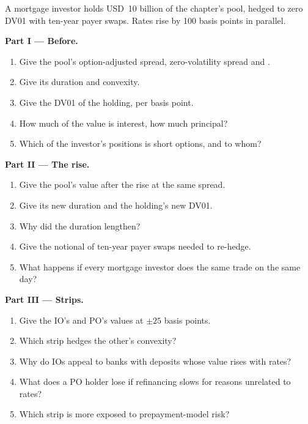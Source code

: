 \begin{problem}\label{pb:rc:mortgage-modelling:1}
A mortgage investor holds USD~10 billion of the chapter's pool, hedged to zero DV01 with
ten-year payer swaps. Rates rise by 100 basis points in parallel.

\medskip\noindent\textbf{Part I --- Before.}
\begin{enumerate}
\item Give the pool's option-adjusted spread, zero-volatility spread and .
\item Give its duration and convexity.
\item Give the DV01 of the holding, per basis point.
\item How much of the value is interest, how much principal?
\item Which of the investor's positions is short options, and to whom?
\end{enumerate}

\medskip\noindent\textbf{Part II --- The rise.}
\begin{enumerate}[resume]
\item Give the pool's value after the rise at the same spread.
\item Give its new duration and the holding's new DV01.
\item Why did the duration lengthen?
\item Give the notional of ten-year payer swaps needed to re-hedge.
\item What happens if every mortgage investor does the same trade on the same day?
\end{enumerate}

\medskip\noindent\textbf{Part III --- Strips.}
\begin{enumerate}[resume]
\item Give the IO's and PO's values at $\pm25$ basis points.
\item Which strip hedges the other's convexity?
\item Why do IOs appeal to banks with deposits whose value rises with rates?
\item What does a PO holder lose if refinancing slows for reasons unrelated to rates?
\item Which strip is more exposed to prepayment-model risk?
\end{enumerate}


\end{problem}
